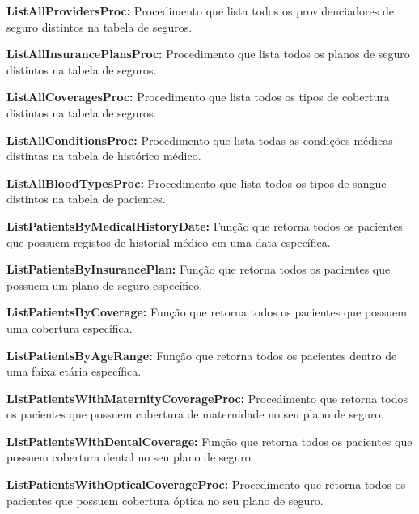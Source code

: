 \vspace{0.15cm}
\textbf{ListAllProvidersProc:} Procedimento que lista todos os providenciadores de seguro distintos na tabela de seguros.

\vspace{0.15cm}
\textbf{ListAllInsurancePlansProc:} Procedimento que lista todos os planos de seguro distintos na tabela de seguros.

\vspace{0.15cm}
\textbf{ListAllCoveragesProc:} Procedimento que lista todos os tipos de cobertura distintos na tabela de seguros.

\vspace{0.15cm}
\textbf{ListAllConditionsProc:} Procedimento que lista todas as condições médicas distintas na tabela de histórico médico.

\vspace{0.15cm}
\textbf{ListAllBloodTypesProc:} Procedimento que lista todos os tipos de sangue distintos na tabela de pacientes.

\vspace{0.15cm}
\textbf{ListPatientsByMedicalHistoryDate:} Função que retorna todos os pacientes que possuem registos de historial médico em uma data específica.

\vspace{0.15cm}
\textbf{ListPatientsByInsurancePlan:} Função que retorna todos os pacientes que possuem um plano de seguro específico.

\vspace{0.15cm}
\textbf{ListPatientsByCoverage:} Função que retorna todos os pacientes que possuem uma cobertura específica.

\vspace{0.15cm}
\textbf{ListPatientsByAgeRange:} Função que retorna todos os pacientes dentro de uma faixa etária específica.

\vspace{0.15cm}
\textbf{ListPatientsWithMaternityCoverageProc:} Procedimento  que retorna todos os pacientes que possuem cobertura de maternidade no seu plano de seguro.

\vspace{0.15cm}
\textbf{ListPatientsWithDentalCoverage:} Função que retorna todos os pacientes que possuem cobertura dental no seu plano de seguro.

\vspace{0.15cm}
\textbf{ListPatientsWithOpticalCoverageProc:} Procedimento que retorna todos os pacientes que possuem cobertura óptica no seu plano de seguro.

